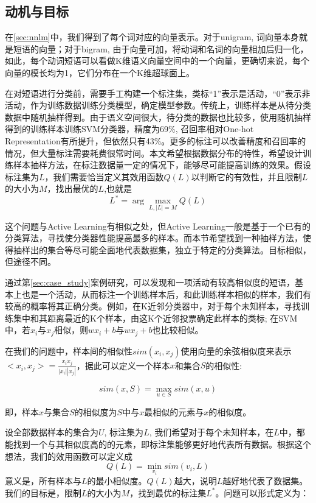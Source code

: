 \subsection{动机与目标}
在\ref{sec:nnlm}中，我们得到了每个词对应的向量表示。对于unigram, 词向量本身就是短语的向量；对于bigram, 由于向量可加，将动词和名词的向量相加后归一化，如此，每个动词短语可以看做K维语义向量空间中的一个向量，更确切来说，每个向量的模长均为1，它们分布在一个K维超球面上。

在对短语进行分类前，需要手工构建一个标注集，类标``1''表示是活动，``0''表示非活动，作为训练数据训练分类模型，确定模型参数。传统上，训练样本是从待分类数据中随机抽样得到。由于语义空间很大，待分类的数据也比较多，使用随机抽样得到的训练样本训练SVM分类器，精度为69\%, 召回率相对One-hot Representation有所提升，但依然只有43\%。更多的标注可以改善精度和召回率的情况，但大量标注需要耗费很常时间。本文希望根据数据分布的特性，希望设计训练样本抽样方法，在标注数据量一定的情况下，能够尽可能提高训练的效果。假设标注集为$L$，我们需要恰当定义其效用函数$Q(L)$以判断它的有效性，并且限制$L$的大小为$M$，找出最优的$L$,也就是
\[
    L^* = \arg\max_{L,|L| = M} Q(L)
\]

这个问题与Active Learning有相似之处，但Active Learning一般是基于一个已有的分类算法，寻找使分类器性能提高最多的样本。而本节希望找到一种抽样方法，使得抽样出的集合等尽可能全面地代表数据集，独立于特定的分类算法。目标相似，但途径不同。

通过第\ref{sec:case_study}案例研究，可以发现和一项活动有较高相似度的短语，基本上也是一个活动，从而标注一个训练样本后，和此训练样本相似的样本，我们有较高的概率将其正确分类。例如，在K近邻分类器中，对于每个未知样本，寻找训练集中和其距离最近的K个样本，由这K个近邻投票确定此样本的类标; 在SVM中，若$x_i$与$x_j$相似，则$wx_i+b$与$wx_j+b$也比较相似。

在我们的问题中，样本间的相似性$sim(x_i, x_j)$使用向量的余弦相似度来表示$<x_i, x_j>=\frac{x_i\dot x_j}{|x_i||x_j|}$，据此可以定义一个样本$x$和集合$S$的相似性:

\begin{definition}
\[
    sim(x, S) = \mathop {\max }\limits_{u \in S} sim(x,u)
\]
\end{definition}
即，样本$x$与集合$S$的相似度为$S$中与$x$最相似的元素与$x$的相似度。

设全部数据样本的集合为$U$, 标注集为$L$, 我们希望对于每个未知样本，在$L$中，都能找到一个与其相似度高的的元素，即标注集能够更好地代表所有数据。根据这个想法，我们的效用函数可以定义成
\[
    Q(L) = \mathop {\min }\limits_{{v_i}} sim({v_i},L)
\]
意义是，所有样本与$L$的最小相似度。$Q(L)$越大，说明$L$越好地代表了数据集。我们的目标是，限制$L$的大小为$M$，找到最优的标注集$L^*$。问题可以形式定义为：

